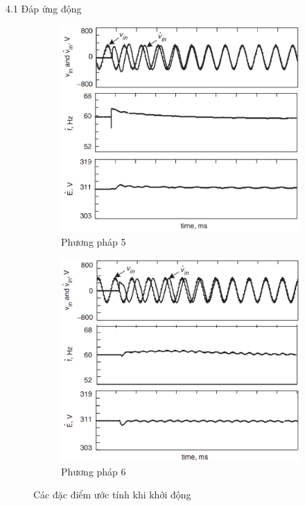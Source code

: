 \documentclass[11pt]{beamer}
\begin{document}
\begin{frame}[t]{4.1 Đáp ứng động}
	\begin{figure}
		\ContinuedFloat
		\begin{subfigure}{0.5\textwidth}
			\includegraphics[width=\linewidth]{fig12e}
			\caption{Phương pháp 5}
		\end{subfigure}%
		\begin{subfigure}{0.5\textwidth}
			\includegraphics[width=\linewidth]{fig12f}
			\caption{Phương pháp 6}
		\end{subfigure}
		\caption{Các đặc điểm ước tính khi khởi động}
	\end{figure}	
	
\end{frame}
\end{document}
